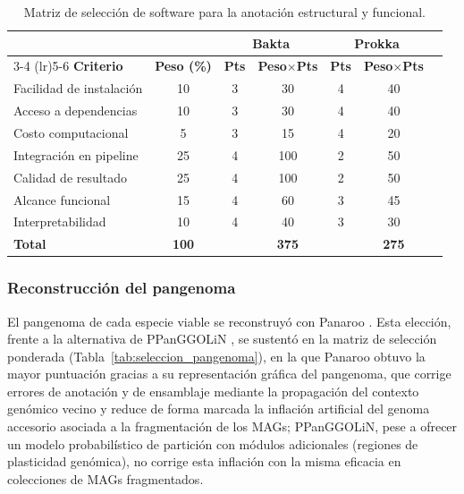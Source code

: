 \begin{table}[H]
\centering
\footnotesize
\caption{Matriz de selección de software para la anotación estructural y funcional.}
\label{tab:seleccion_anotacion}
\begin{tabular}{@{}lcccccc@{}}
\toprule
& & \multicolumn{2}{c}{\textbf{Bakta}} & \multicolumn{2}{c}{\textbf{Prokka}} \\
\cmidrule(lr){3-4} \cmidrule(lr){5-6}
\textbf{Criterio} & \textbf{Peso (\%)} & \textbf{Pts} & \textbf{Peso$\times$Pts} & \textbf{Pts} & \textbf{Peso$\times$Pts} \\
\midrule
Facilidad de instalación & 10 & 3 & 30  & 4 & 40 \\
Acceso a dependencias    & 10 & 3 & 30  & 4 & 40 \\
Costo computacional      & 5  & 3 & 15  & 4 & 20 \\
Integración en pipeline  & 25 & 4 & 100 & 2 & 50 \\
Calidad de resultado     & 25 & 4 & 100 & 2 & 50 \\
Alcance funcional        & 15 & 4 & 60  & 3 & 45 \\
Interpretabilidad        & 10 & 4 & 40  & 3 & 30 \\
\midrule
\textbf{Total} & \textbf{100} & & \textbf{375} & & \textbf{275} \\
\bottomrule
\end{tabular}
\end{table}

\subsubsection{Reconstrucción del pangenoma}

El pangenoma de cada especie viable se reconstruyó con Panaroo \cite{panaroo2020}. Esta elección, frente a la alternativa de PPanGGOLiN \cite{ppanggolin2020}, se sustentó en la matriz de selección ponderada (Tabla~\ref{tab:seleccion_pangenoma}), en la que Panaroo obtuvo la mayor puntuación gracias a su representación gráfica del pangenoma, que corrige errores de anotación y de ensamblaje mediante la propagación del contexto genómico vecino y reduce de forma marcada la inflación artificial del genoma accesorio asociada a la fragmentación de los MAGs; PPanGGOLiN, pese a ofrecer un modelo probabilístico de partición con módulos adicionales (regiones de plasticidad genómica), no corrige esta inflación con la misma eficacia en colecciones de MAGs fragmentados.

